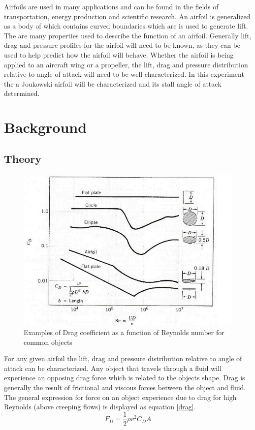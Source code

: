 \documentclass[paper=a4, fontsize=11pt, abstract=on]{scrartcl}
\numberwithin{equation}{section}		%
\numberwithin{figure}{section}			%
\numberwithin{table}{section}				%
\begin{document}
Airfoils are used in many applications and can be found in the fields of transportation, energy production and scientific research. An airfoil is generalized as a body of which contains curved boundaries which are is used to generate lift. The are many properties used to describe the function of an airfoil. Generally lift, drag and pressure profiles for the airfoil will need to be known, as they can be used to help predict how the airfoil will behave. Whether the airfoil is being applied to an aircraft wing or a propeller, the lift, drag and pressure distribution relative to angle of attack will need to be well characterized. In this experiment the a Joukowski airfoil will be characterized and its stall angle of attack determined.

\section{Background}
\subsection{Theory}
\begin{figure}[H]
\centering
\includegraphics[width=0.8\linewidth]{comp}
\caption{Examples of Drag coefficient as a function of Reynolds number for common objects}
\label{comp}
\end{figure}

For any given airfoil the lift, drag and pressure distribution relative to angle of attack can be characterized. Any object that travels through a fluid will experience an opposing drag force which is related to the objects shape. Drag is generally the result of frictional and viscous forces between the object and fluid. The general expression for force on an object experience due to drag for high Reynolds (above creeping flows) is displayed as equation \ref{drag}.
 \begin{equation}
\label{drag}
F_D= \frac{1}{2}\rho v^2C_DA
\end{equation}
\end{document}
